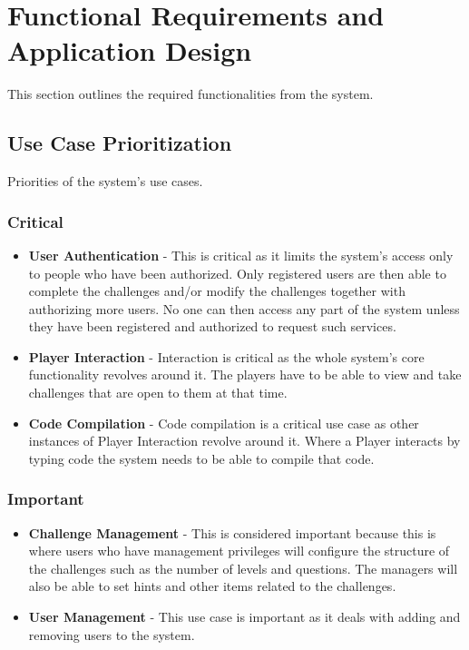 \documentclass[english]{article}
\begin{document}
	\newpage
	\section{Functional Requirements and Application Design}
	This section outlines the required functionalities from the system.
		\subsection{Use Case Prioritization}
		Priorities of the system's use cases.
		\subsubsection{Critical}
		\begin{itemize}
	  		\item \textbf{User Authentication} - This is critical as it limits the system's access only to people who have been authorized. Only registered users are then able to 		complete the challenges and/or modify the challenges together with authorizing more users. No one can then access any part of the system unless they have been registered and authorized to request such services.
	  		
			\item \textbf{Player Interaction} -  Interaction is critical as the whole system's core functionality revolves around it. The players have to be able to view and take challenges that are open to them at that time.
			
			\item \textbf{Code Compilation} - Code compilation is a critical use case as other instances of Player Interaction revolve around it. Where a Player interacts by typing code the system needs to be able to compile that code.
	   \end{itemize} 
		
		\subsubsection{Important}
		\begin{itemize}
	  		\item \textbf{Challenge Management} - This is considered important because this is where users who have management privileges will configure the structure of the challenges such as the number of levels and questions. The managers will also be able to set hints and other items related to the challenges.
	  		
	  		\item \textbf{User Management} - This use case is important as it deals with adding and removing users to the system. 
	   \end{itemize} 
			
\end{document}
